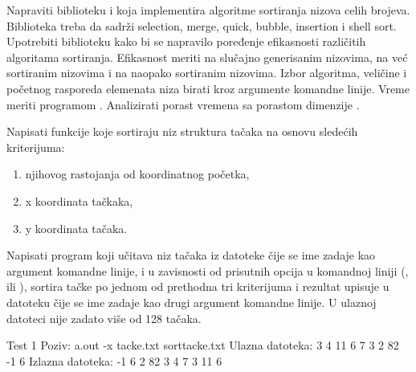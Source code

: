 \begin{Exercise}[label=507]
  Napraviti biblioteku  i  koja
  implementira algoritme sortiranja nizova celih brojeva. Biblioteka
  treba da sadrži selection, merge, quick, bubble, insertion i shell
  sort. Upotrebiti biblioteku kako bi se napravilo poređenje
  efikasnosti različitih algoritama sortiranja. Efikasnost meriti na
  slučajno generisanim nizovima, na već sortiranim nizovima i na
  naopako sortiranim nizovima. Izbor algoritma, veličine i početnog
  rasporeda elemenata niza birati kroz argumente komandne linije.
  Vreme meriti programom . Analizirati porast vremena sa
  porastom dimenzije .
  
\end{Exercise}

\begin{Exercise}[label=508]
  Napisati funkcije koje sortiraju niz struktura tačaka na
  osnovu sledećih kriterijuma:
  \begin{enumerate}
  \item njihovog rastojanja od koordinatnog početka,
  \item x koordinata tačkaka,
  \item y koordinata tačaka.
  \end{enumerate}
  Napisati program koji učitava niz tačaka iz datoteke čije se ime
  zadaje kao argument komandne linije, i u zavisnosti od prisutnih
  opcija u komandnoj liniji (,  ili ),
  sortira tačke po jednom od prethodna tri kriterijuma i rezultat
  upisuje u datoteku čije se ime zadaje kao drugi argument komandne
  linije. U ulaznoj datoteci nije zadato više od 128 tačaka.
  
\begin{miditest}
\begin{test}{Test 1}
Poziv:  a.out -x tacke.txt sorttacke.txt
Ulazna datoteka:
3 4
11 6
7 3
2 82
-1 6
Izlazna datoteka:
-1 6
2 82
3 4
7 3
11 6
\end{test}
\end{miditest}
  
\end{Exercise}

